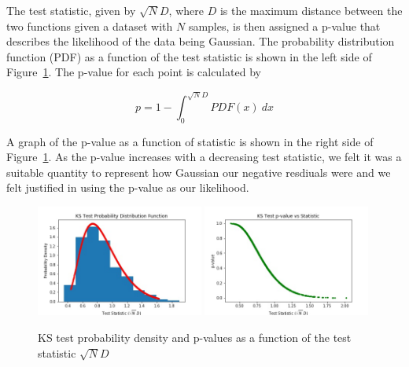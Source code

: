 \documentclass[letterpaper, 10pt]{article}
\begin{document}
The test statistic, given by $\sqrt{N}D$, where $D$ is the maximum distance between the two functions given a dataset with $N$ samples, is then assigned a p-value that describes the likelihood of the data being Gaussian. The probability distribution function (PDF) as a function of the test statistic is shown in the left side of Figure~\ref{kspdf}. The p-value for each point is calculated by 

\[p = 1 - \int_{0}^{\sqrt{N}D} PDF(x)\ dx \]

A graph of the p-value as a function of statistic is shown in the right side of Figure~\ref{kspdf}. As the p-value increases with a decreasing test statistic, we felt it was a suitable quantity to represent how Gaussian our negative resdiuals were and we felt justified in using the p-value as our likelihood. 


\begin{figure}[H]
\begin{center}
\includegraphics[width=0.49\textwidth]{kstestPDF.jpg}
\includegraphics[width=0.49\textwidth]{kstest_pvaluedist.jpg}
\caption{KS test probability density and p-values as a function of the test statistic $\sqrt{N}D$}
\label{kspdf}
\end{center}
\end{figure}
\end{document}
